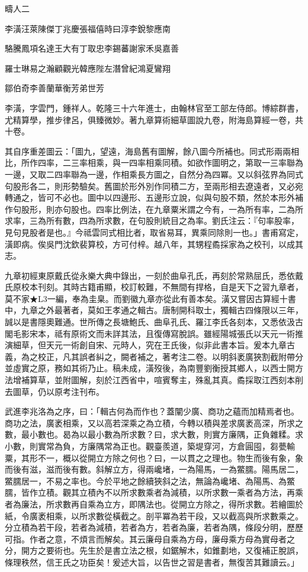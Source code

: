 
\begin{pinyinscope}
疇人二

李潢汪萊陳傑丁兆慶張福僖時曰淳李銳黎應南

駱騰鳳項名達王大有丁取忠李錫蕃謝家禾吳嘉善

羅士琳易之瀚顧觀光韓應陛左潛曾紀鴻夏鸞翔

鄒伯奇李善蘭華衡芳弟世芳

李潢，字雲門，鍾祥人。乾隆三十六年進士，由翰林官至工部左侍郎。博綜群書，尤精算學，推步律呂，俱臻微妙。著九章算術細草圖說九卷，附海島算經一卷，共十卷。

其自序重差圖云：「圖九，望遠，海島舊有圖解，餘八圖今所補也。同式形兩兩相比，所作四率，二三率相乘，與一四率相乘同積。如欲作圖明之，第取一三率聯為一邊，又取二四率聯為一邊，作相乘長方圖之，自然分為四冪。又以斜弦界為同式句股形各二，則形勢驗矣。舊圖於形外別作同積二方，至兩形相去遼遠者，又必宛轉通之，皆可不必也。圖中以四邊形、五邊形立說，似與句股不類，然於本形外補作句股形，則亦句股也。四率比例法，在九章粟米謂之今有，一為所有率，二為所求率，三為所有數，四為所求數，在句股則統目之為率。劉氏注云：『句率股率，見句見股者是也。』今祗雲同式相比者，取省易耳，異乘同除則一也。」書甫寫定，潢即病。俟吳門沈欽裴算校，方可付梓。越八年，其甥程矞採家為之校刊，以成其志。

九章初經東原戴氏從永樂大典中錄出，一刻於曲阜孔氏，再刻於常熟屈氏，悉依戴氏原校本刊刻。其時古籍甫顯，校訂較難，不無間有捍格，自是天下之習九章者，莫不家★L3一編，奉為圭臬。而劉徽九章亦從此有善本矣。潢又嘗因古算經十書中，九章之外最著者，莫如王孝通之輯古。唐制開科取士，獨輯古四條限以三年，誠以是書隱奧難通。世所傳之長塘鮑氏、曲阜孔氏、羅江李氏各刻本，又悉依汲古閣毛影宋本，祗有原術文而未詳其法，且復傳寫脫誤。雖經陽城張氏以天元一術推演細草，但天元一術創自宋、元時人，究在王氏後，似非此書本旨。爰本九章古義，為之校正，凡其誤者糾之，闕者補之，著考注二卷。以明斜袤廣狹割截附帶分並虛實之原，務如其術乃止。稿未成，潢歿後，為南豐劉衡授其鄉人，以西士開方法增補算草，並附圖解，刻於江西省中，喧賓奪主，殊亂其真。矞採取江西刻本削去圖草，仍以原考注刊布。

武進李兆洛為之序，曰：「輯古何為而作也？蓋闡少廣、商功之蘊而加精焉者也。商功之法，廣袤相乘，又以高若深乘之為立積，今轉以積與差求廣袤高深，所求之數，最小數也。曷為以最小數為所求數？曰，求大數，則實方廉隅，正負雜糅。求小數，則實常為負，方廉隅常為正也。觀臺羨道，築堤穿河，方倉圓囤，芻甍輸粟，其形不一，概以從開立方除之何也？曰，一以貫之之理也。物生而後有象，象而後有滋，滋而後有數。斜解立方，得兩巉堵，一為陽馬，一為鱉臑。陽馬居二，鱉臑居一，不易之率也。今於平地之餘續狹斜之法，無論為巉堵、為陽馬、為鱉臑，皆作立積。觀其立積內不以所求數乘者為減積，以所求數一乘者為方法，再乘者為廉法，所求數再自乘為立方，即隅法也。從開立方除之，得所求數。若繪圖於紙，令廣袤相乘，以所求數從橫截之。剖平冪為若干段，又以截高與所求數乘之。分立積為若干段，若者為減積，若者為方，若者為廉，若者為隅，條段分明，歷歷可指。作者之意，不煩言而解矣。其云廉母自乘為方母，廉母乘方母為實母者之分，開方之要術也。先生於是書立法之根，如鋸解木，如錐劃地，又復補正脫誤，條理秩然，信王氏之功臣矣！爰述大旨，以告世之習是書者，無復苦其難讀云。」


\end{pinyinscope}
